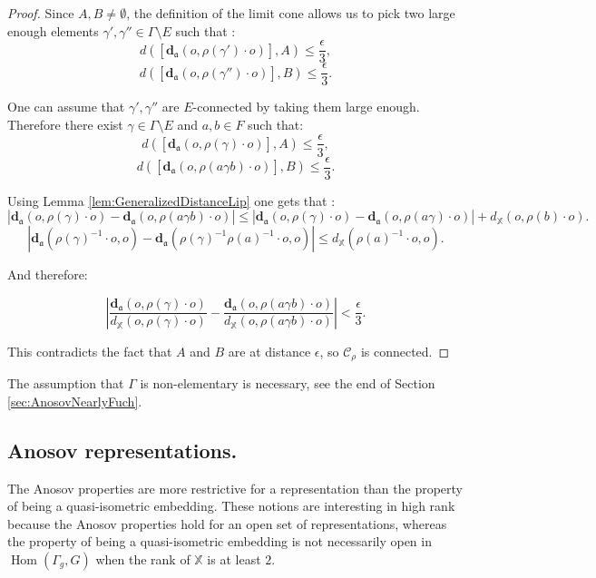 \documentclass[reqno,10pt]{amsart}
\theoremstyle{plain}
\theoremstyle{definition}
\theoremstyle{remark}
\newcommand{\da}{\mathbf{d}_{\mathfrak{a}}}
\DeclareMathOperator{\Hom}{Hom}
\newcommand{\X}{\mathbb{X}}
\begin{document}
\begin{proof}
\medskip

Since $A,B\neq \emptyset$, the definition of the limit cone allows us to pick two large enough elements $\gamma',\gamma''\in\Gamma\setminus E$ such that :
 $$d(\left[\da(o,\rho(\gamma')\cdot o)\right],A)\leq\frac{\epsilon}{3},$$
 $$d(\left[\da(o,\rho(\gamma'')\cdot o)\right],B)\leq\frac{\epsilon}{3}.$$
 
 One can assume that $\gamma',\gamma''$ are $E$-connected by taking them large enough. Therefore there exist $\gamma\in \Gamma\setminus E$ and $a,b\in F$ such that:
  $$d(\left[\da(o,\rho(\gamma)\cdot o)\right],A)\leq\frac{\epsilon}{3},$$
  $$d(\left[\da(o,\rho(a\gamma b)\cdot o)\right],B)\leq\frac{\epsilon}{3}.$$
  
  
 Using Lemma \ref{lem:GeneralizedDistanceLip} one gets that :
$$|\da(o,\rho(\gamma)\cdot o)-\da(o,\rho(a\gamma b)\cdot o)|\leq |\da(o,\rho(\gamma)\cdot o)-\da(o,\rho(a\gamma )\cdot o)|+d_\X( o,\rho(b)\cdot o).$$ %
$$|\da(\rho(\gamma)^{-1}\cdot o, o)-\da(\rho(\gamma)^{-1}\rho(a)^{-1}\cdot o, o)|\leq d_\X(\rho(a)^{-1}\cdot o,o).$$

And therefore:

$$\left|\frac{\da(o,\rho(\gamma)\cdot o)}{d_\X(o,\rho(\gamma)\cdot o)}-\frac{\da(o,\rho(a\gamma b)\cdot o)}{d_\X(o,\rho(a\gamma b)\cdot o)}\right|< \frac{\epsilon}{3}.$$


This contradicts the fact that $A$ and $B$ are at distance $\epsilon$, so $\mathcal{C}_\rho$ is connected.
 

\end{proof}

The assumption that $\Gamma$ is non-elementary is necessary, see the end of Section \ref{sec:AnosovNearlyFuch}.

\subsection{Anosov representations.}

The Anosov properties are more restrictive for a representation than the property of being a quasi-isometric embedding. These notions are interesting in high rank because the Anosov properties hold for an open set of representations, whereas the property of being a quasi-isometric embedding is not necessarily open in $\Hom(\Gamma_g,G)$ when the rank of $\X$ is at least $2$.
\end{document}
